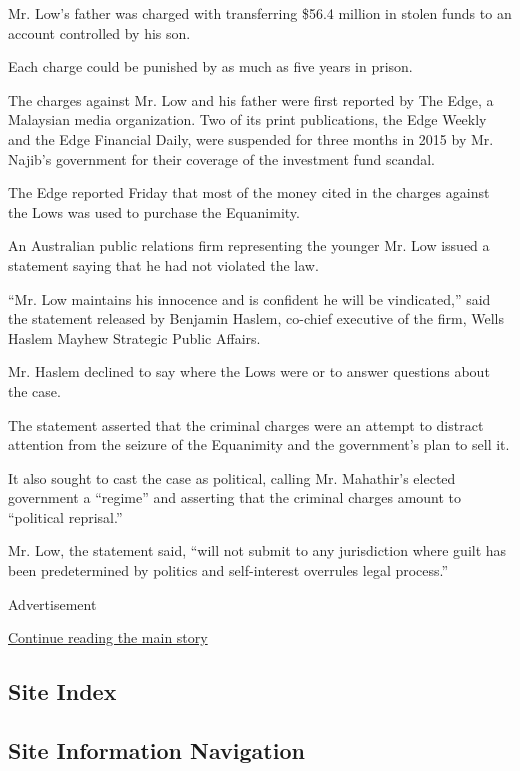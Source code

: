 Mr. Low's father was charged with transferring \$56.4 million in stolen
funds to an account controlled by his son.

Each charge could be punished by as much as five years in prison.

The charges against Mr. Low and his father were first reported by The
Edge, a Malaysian media organization. Two of its print publications, the
Edge Weekly and the Edge Financial Daily, were suspended for three
months in 2015 by Mr. Najib's government for their coverage of the
investment fund scandal.

The Edge reported Friday that most of the money cited in the charges
against the Lows was used to purchase the Equanimity.

An Australian public relations firm representing the younger Mr. Low
issued a statement saying that he had not violated the law.

``Mr. Low maintains his innocence and is confident he will be
vindicated,'' said the statement released by Benjamin Haslem, co-chief
executive of the firm, Wells Haslem Mayhew Strategic Public Affairs.

Mr. Haslem declined to say where the Lows were or to answer questions
about the case.

The statement asserted that the criminal charges were an attempt to
distract attention from the seizure of the Equanimity and the
government's plan to sell it.

It also sought to cast the case as political, calling Mr. Mahathir's
elected government a ``regime'' and asserting that the criminal charges
amount to ``political reprisal.''

Mr. Low, the statement said, ``will not submit to any jurisdiction where
guilt has been predetermined by politics and self-interest overrules
legal process.''

Advertisement

\protect\hyperlink{after-bottom}{Continue reading the main story}

\hypertarget{site-index}{%
\subsection{Site Index}\label{site-index}}

\hypertarget{site-information-navigation}{%
\subsection{Site Information
Navigation}\label{site-information-navigation}}

